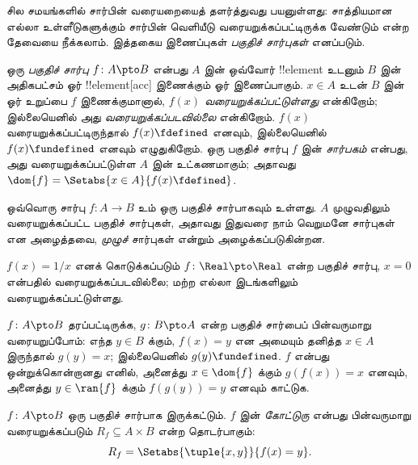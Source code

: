 \documentclass[../../../include/open-logic-section]{subfiles}
\begin{document}


\begin{explain}
சில சமயங்களில் சார்பின் வரையறையைத் தளர்த்துவது பயனுள்ளது:
சாத்தியமான எல்லா உள்ளீடுகளுக்கும் சார்பின் வெளியீடு வரையறுக்கப்பட்டிருக்க
வேண்டும் என்ற தேவையை நீக்கலாம்.
இத்தகைய இணைப்புகள் \emph{பகுதிச் சார்புகள்} எனப்படும்.
\end{explain}

\begin{defn}
ஒரு \emph{பகுதிச் சார்பு} $f \colon A \pto B$ என்பது
$A$ இன் ஒவ்வோர் !!{element} உடனும் $B$ இன் அதிகபட்சம்
ஓர் !!{element}[acc] இணைக்கும் ஓர் இணைப்பாகும்.
$x \in A$ உடன் $B$ இன் ஓர் உறுப்பை $f$ இணைக்குமானால்,
$f(x)$ \emph{வரையறுக்கப்பட்டுள்ளது} என்கிறோம்;
இல்லையெனில் அது \emph{வரையறுக்கப்படவில்லை} என்கிறோம்.
$f(x)$ வரையறுக்கப்பட்டிருந்தால் $f(x) \fdefined$ எனவும்,
இல்லையெனில் $f(x) \fundefined$ எனவும் எழுதுகிறோம்.
ஒரு பகுதிச் சார்பு $f$ இன் \emph{சார்பகம்} என்பது,
அது வரையறுக்கப்பட்டுள்ள $A$ இன் உட்கணமாகும்;
அதாவது $\dom{f} = \Setabs{x \in A}{f(x) \fdefined}$.
\end{defn}

\begin{ex}
ஒவ்வொரு சார்பு $f\colon A \to B$ உம் ஒரு பகுதிச் சார்பாகவும் உள்ளது.
$A$ முழுவதிலும் வரையறுக்கப்பட்ட பகுதிச் சார்புகள்,
அதாவது இதுவரை நாம் வெறுமனே சார்புகள் என அழைத்தவை,
\emph{முழுச்} சார்புகள் என்றும் அழைக்கப்படுகின்றன.
\end{ex}

\begin{ex}
$f(x) = 1/x$ எனக் கொடுக்கப்படும்
$f \colon \Real \pto \Real$ என்ற பகுதிச் சார்பு,
$x = 0$ என்பதில் வரையறுக்கப்படவில்லை;
மற்ற எல்லா இடங்களிலும் வரையறுக்கப்பட்டுள்ளது.
\end{ex}

\begin{prob}
$f\colon A \pto B$ தரப்பட்டிருக்க, $g\colon B \pto
A$ என்ற பகுதிச் சார்பைப் பின்வருமாறு வரையறுப்போம்:
எந்த $y \in B$ க்கும், $f(x) = y$ என அமையும்
தனித்த $x \in A$ இருந்தால் $g(y) = x$;
இல்லையெனில் $g(y) \fundefined$.
$f$ என்பது ஒன்றுக்கொன்றானது எனில்,
அனைத்து $x \in \dom{f}$ க்கும் $g(f(x)) = x$ எனவும்,
அனைத்து $y \in \ran{f}$ க்கும் $f(g(y)) = y$ எனவும் காட்டுக.
\end{prob}

\begin{defn}[பகுதிச் சார்பின் கோட்டுரு]
$f\colon A \pto B$ ஒரு பகுதிச் சார்பாக இருக்கட்டும்.
$f$ இன் \emph{கோட்டுரு} என்பது பின்வருமாறு வரையறுக்கப்படும்
$R_f \subseteq A \times B$ என்ற தொடர்பாகும்:
\[
R_f = \Setabs{\tuple{x,y}}{f(x) = y}.
\]
\end{defn}
\end{document}
